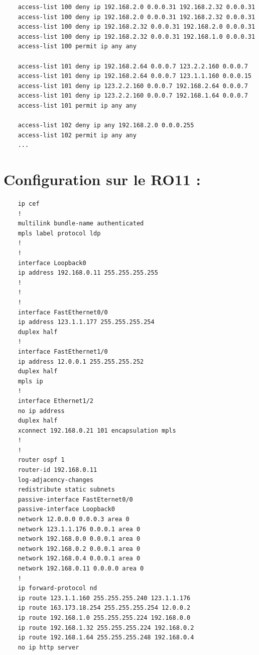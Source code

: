 \documentclass[12pt,a4paper, oneside]{memoir}
\begin{document}
\begin{verbatim}
	access-list 100 deny ip 192.168.2.0 0.0.0.31 192.168.2.32 0.0.0.31
	access-list 100 deny ip 192.168.2.0 0.0.0.31 192.168.2.32 0.0.0.31
	access-list 100 deny ip 192.168.2.32 0.0.0.31 192.168.2.0 0.0.0.31
	access-list 100 deny ip 192.168.2.32 0.0.0.31 192.168.1.0 0.0.0.31
	access-list 100 permit ip any any
	
	access-list 101 deny ip 192.168.2.64 0.0.0.7 123.2.2.160 0.0.0.7
	access-list 101 deny ip 192.168.2.64 0.0.0.7 123.1.1.160 0.0.0.15
	access-list 101 deny ip 123.2.2.160 0.0.0.7 192.168.2.64 0.0.0.7
	access-list 101 deny ip 123.2.2.160 0.0.0.7 192.168.1.64 0.0.0.7
	access-list 101 permit ip any any
	
	access-list 102 deny ip any 192.168.2.0 0.0.0.255
	access-list 102 permit ip any any
	...
\end{verbatim}


\section{Configuration sur le RO11 :  }
\begin{verbatim}
	ip cef
	!
	multilink bundle-name authenticated
	mpls label protocol ldp
	!
	!
	interface Loopback0
	ip address 192.168.0.11 255.255.255.255
	!
	!
	!
	interface FastEthernet0/0
	ip address 123.1.1.177 255.255.255.254
	duplex half
	!
	interface FastEthernet1/0
	ip address 12.0.0.1 255.255.255.252
	duplex half
	mpls ip
	!
	interface Ethernet1/2
	no ip address
	duplex half
	xconnect 192.168.0.21 101 encapsulation mpls
	! 
	!
	router ospf 1
	router-id 192.168.0.11
	log-adjacency-changes
	redistribute static subnets
	passive-interface FastEternet0/0
	passive-interface Loopback0
	network 12.0.0.0 0.0.0.3 area 0
	network 123.1.1.176 0.0.0.1 area 0
	network 192.168.0.0 0.0.0.1 area 0
	network 192.168.0.2 0.0.0.1 area 0
	network 192.168.0.4 0.0.0.1 area 0
	network 192.168.0.11 0.0.0.0 area 0
	! 
	ip forward-protocol nd
	ip route 123.1.1.160 255.255.255.240 123.1.1.176
	ip route 163.173.18.254 255.255.255.254 12.0.0.2
	ip route 192.168.1.0 255.255.255.224 192.168.0.0
	ip route 192.168.1.32 255.255.255.224 192.168.0.2
	ip route 192.168.1.64 255.255.255.248 192.168.0.4
	no ip http server
\end{verbatim}
\end{document}
